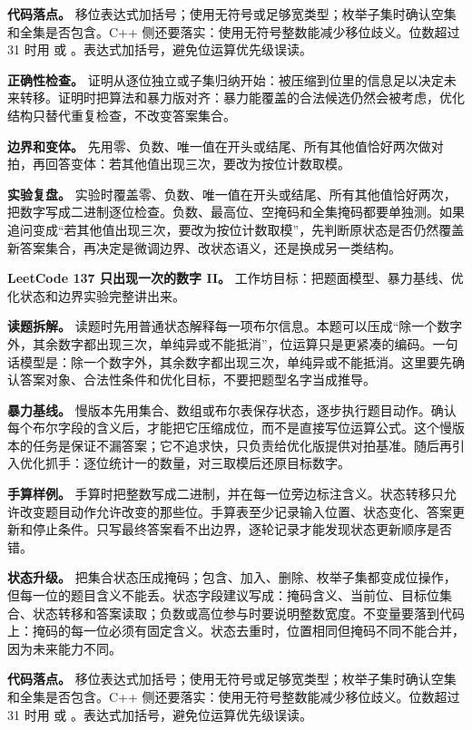 \textbf{代码落点。} 移位表达式加括号；使用无符号或足够宽类型；枚举子集时确认空集和全集是否包含。C++ 侧还要落实：使用无符号整数能减少移位歧义。位数超过 31 时用  或 。表达式加括号，避免位运算优先级误读。

\textbf{正确性检查。} 证明从逐位独立或子集归纳开始：被压缩到位里的信息足以决定未来转移。证明时把算法和暴力版对齐：暴力能覆盖的合法候选仍然会被考虑，优化结构只替代重复检查，不改变答案集合。

\textbf{边界和变体。} 先用零、负数、唯一值在开头或结尾、所有其他值恰好两次做对拍，再回答变体：若其他值出现三次，要改为按位计数取模。

\textbf{实验复盘。} 实验时覆盖零、负数、唯一值在开头或结尾、所有其他值恰好两次，把数字写成二进制逐位检查。负数、最高位、空掩码和全集掩码都要单独测。如果追问变成“若其他值出现三次，要改为按位计数取模”，先判断原状态是否仍然覆盖新答案集合，再决定是微调边界、改状态语义，还是换成另一类结构。

\noindent\textbf{LeetCode 137 只出现一次的数字 II。} 工作坊目标：把题面模型、暴力基线、优化状态和边界实验完整讲出来。

\textbf{读题拆解。} 读题时先用普通状态解释每一项布尔信息。本题可以压成“除一个数字外，其余数字都出现三次，单纯异或不能抵消”，位运算只是更紧凑的编码。一句话模型是：除一个数字外，其余数字都出现三次，单纯异或不能抵消。这里要先确认答案对象、合法性条件和优化目标，不要把题型名字当成推导。

\textbf{暴力基线。} 慢版本先用集合、数组或布尔表保存状态，逐步执行题目动作。确认每个布尔字段的含义后，才能把它压缩成位，而不是直接写位运算公式。这个慢版本的任务是保证不漏答案；它不追求快，只负责给优化版提供对拍基准。随后再引入优化抓手：逐位统计一的数量，对三取模后还原目标数字。

\textbf{手算样例。} 手算时把整数写成二进制，并在每一位旁边标注含义。状态转移只允许改变题目动作允许改变的那些位。手算表至少记录输入位置、状态变化、答案更新和停止条件。只写最终答案看不出边界，逐轮记录才能发现状态更新顺序是否错。

\textbf{状态升级。} 把集合状态压成掩码；包含、加入、删除、枚举子集都变成位操作，但每一位的题目含义不能丢。状态字段建议写成：掩码含义、当前位、目标位集合、状态转移和答案读取；负数或高位参与时要说明整数宽度。不变量要落到代码上：掩码的每一位必须有固定含义。状态去重时，位置相同但掩码不同不能合并，因为未来能力不同。

\textbf{代码落点。} 移位表达式加括号；使用无符号或足够宽类型；枚举子集时确认空集和全集是否包含。C++ 侧还要落实：使用无符号整数能减少移位歧义。位数超过 31 时用  或 。表达式加括号，避免位运算优先级误读。

